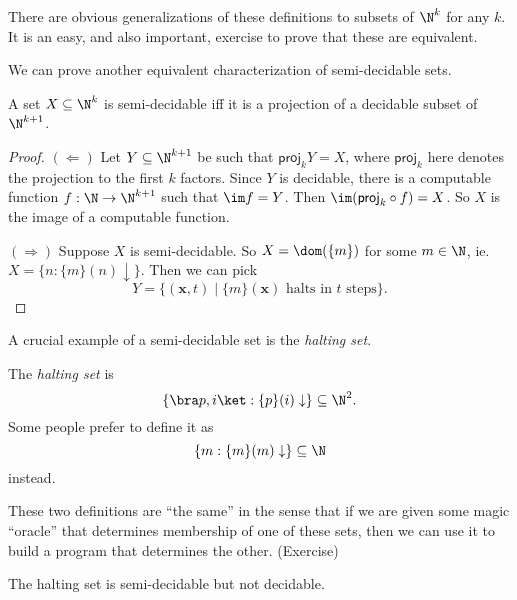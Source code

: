 \documentclass[a4paper]{article}
\newcommand\proj{\mathsf{proj}}
\begin{document}
There are obvious generalizations of these definitions to subsets of $\N^k$ for any $k$. It is an easy, and also important, exercise to prove that these are equivalent.

We can prove another equivalent characterization of semi-decidable sets.
\begin{prop}
  A set $X \subseteq \N^k$ is semi-decidable iff it is a projection of a decidable subset of $\N^{k + 1}$.
\end{prop}

\begin{proof}
  $(\Leftarrow)$ Let $Y \subseteq \N^{k + 1}$ be such that $\proj_k Y = X$, where $\proj_k$ here denotes the projection to the first $k$ factors. Since $Y$ is decidable, there is a computable function $f: \N \to \N^{k + 1}$ such that $\im f = Y$. Then $\im (\proj_k \circ f) = X$. So $X$ is the image of a computable function.

  $(\Rightarrow)$ Suppose $X$ is semi-decidable. So $X = \dom(\{m\})$ for some $m \in \N$, ie. $X = \{n: \{m\}(n) \downarrow\}$. Then we can pick
  \[
    Y = \{(\mathbf{x}, t) \mid \{m\}(\mathbf{x})\text{ halts in $t$ steps}\}.
  \]
\end{proof}

A crucial example of a semi-decidable set is the \emph{halting set}.
\begin{defi}
  The \emph{halting set} is
  \[
    \{\bra p, i\ket : \{p\}(i) \downarrow \} \subseteq \N^2.
  \]
  Some people prefer to define it as
  \[
    \{m: \{m\}(m) \downarrow\} \subseteq \N
  \]
  instead.
\end{defi}
These two definitions are ``the same'' in the sense that if we are given some magic ``oracle'' that determines membership of one of these sets, then we can use it to build a program that determines the other. (Exercise)

\begin{thm}[Turing]
  The halting set is semi-decidable but not decidable.
\end{thm}
\end{document}
